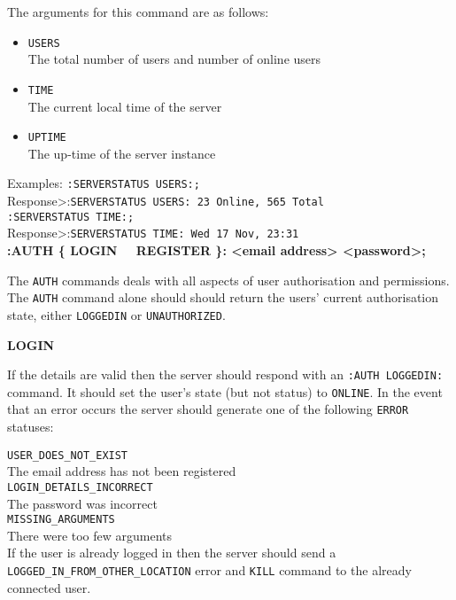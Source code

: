 The arguments for this command are as follows:

\begin{itemize}

\item{ \texttt{USERS} \\
The total number of users and number of online users}

\item{ \texttt{TIME} \\
The current local time of the server}

\item{ \texttt{UPTIME} \\
The up-time of the server instance}

\end{itemize}

Examples:
\texttt{:SERVERSTATUS USERS:;} \\
Response>:\texttt{SERVERSTATUS USERS: 23 Online, 565 Total} \\
\texttt{:SERVERSTATUS TIME:;} \\
Response>:\texttt{SERVERSTATUS TIME: Wed 17 Nov, 23:31} \\

{\bf :AUTH \{ LOGIN \ \vline \ REGISTER \}: <email address> <password>;}

The \texttt{AUTH} commands deals with all aspects of user authorisation and permissions. The \texttt{AUTH} command alone should should return the users' current authorisation state, either \texttt{LOGGEDIN} or \texttt{UNAUTHORIZED}.

{\bf LOGIN}

If the details are valid then the server should respond with an \texttt{:AUTH LOGGEDIN:} command. It should set the user’s state (but not status) to \texttt{ONLINE}.
In the event that an error occurs the server should generate one of the following \texttt{ERROR} statuses:

\texttt{USER\_DOES\_NOT\_EXIST}\\
The email address has not been registered \\
\texttt{LOGIN\_DETAILS\_INCORRECT} \\
The password was incorrect \\
\texttt{MISSING\_ARGUMENTS} \\
There were too few arguments \\

If the user is already logged in then the server should send a \texttt{LOGGED\_IN\_FROM\_OTHER\_LOCATION} error and \texttt{KILL} command to the already connected user.

